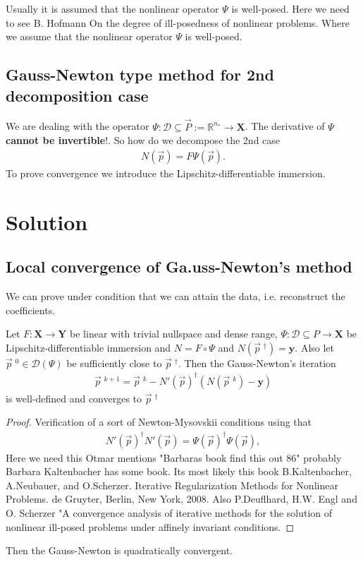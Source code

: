 Usually it is assumed that the nonlinear operator $\Psi$ is well-posed.
Here we need to see B. Hofmann On the degree of ill-posedness of nonlinear
problems. Where we assume that the nonlinear operator $\Psi$ is well-posed.

\subsection{Gauss-Newton type method for 2nd decomposition case}
We are dealing with the operator $\Psi:\mathcal{D} \subseteq \vec{P} :=
\mathbb{R}^{n_*} \to \mathbf{X}$. The derivative of $\Psi$ \textbf{cannot be
invertible}!. So how do we decompose the 2nd case
\begin{align}
    N(\vec{p}) = F\Psi(\vec{p}).
\end{align}
To prove convergence we introduce the Lipschitz-differentiable immersion.

\section{Solution}
\subsection{Local convergence of Ga.uss-Newton's method}
We can prove under condition that we can attain the data, i.e. reconstruct
the coefficients.
\begin{theorem}
    Let $F: \mathbf{X} \to \mathbf{Y}$ be linear with trivial nullspace and
    dense range, $\Psi:\mathcal{D} \subseteq P \to \mathbf{X}$ be
    Lipschitz-differentiable immersion and $N = F\circ \Psi$ and
    $N(\vec{p}\;^{\dagger}) = \mathbf{y}$.
    Also let $\vec{p}\;^{0} \in \mathcal{D}(\Psi)$ be sufficiently close to
    $\vec{p}\;^{\dagger}$. Then the Gauss-Newton's iteration
    \begin{align}
        \vec{p}\;^{k+1} = \vec{p}\;^{k} - N'(\vec{p})^{\dagger}
        \left( N\left( \vec{p}\;^{k} \right) - \mathbf{y} \right)
    \end{align}
    is well-defined and converges to $\vec{p}\;^{\dagger}$
\end{theorem}
\begin{proof}
    Verification of a sort of Newton-Mysovskii conditions using that
    \begin{align}
        N'(\vec{p})^{\dagger}N'(\vec{p}) =
        \Psi(\vec{p})^{\dagger}\Psi(\vec{p}),
    \end{align}
    Here we need this Otmar mentions "Barbaras book find this out 86"
    probably Barbara Kaltenbacher has some book. Its most likely this book
    B.Kaltenbacher, A.Neubauer, and O.Scherzer.
    Iterative Regularization Methods for Nonlinear Problems.
    de Gruyter, Berlin, New York, 2008.
    Also P.Deuflhard, H.W. Engl and O. Scherzer "A convergence analysis of
    iterative methods for the solution of nonlinear ill-posed problems under
    affinely invariant conditions.
\end{proof}
Then the Gauss-Newton is quadratically convergent.
